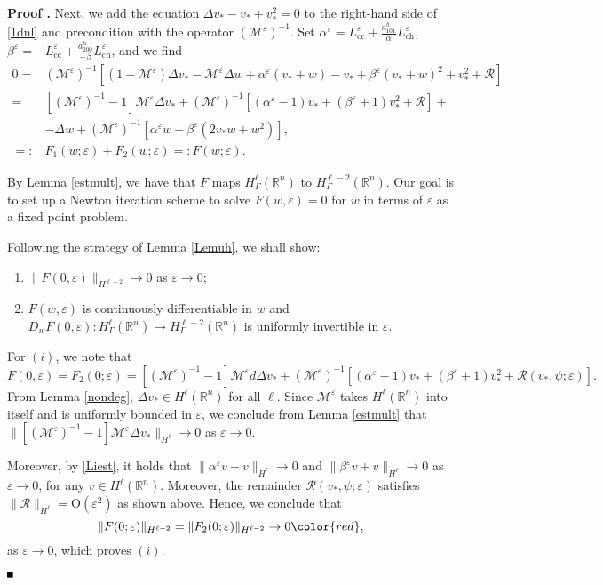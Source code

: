 \documentclass[10pt]{article}
\newenvironment{Proof}[1][\unskip]%
 {\begin{trivlist} \item[]{\bf Proof #1. }}%
 {\hspace*{\fill}$\rule{.4\baselineskip}{.4\baselineskip}$\end{trivlist}}
\newcommand{\R}{\mathbb{R}}
\newcommand{\rmO}{\mathrm{O}}
\newcommand{\eps}{\varepsilon}
\newcommand{\M}{\mathcal{M}}
\newcommand{\Rm}{\mathcal{R}}
\begin{document}
\begin{Proof}
Next, we add the equation $\Delta v_*-v_*+v_*^2 =0$ to the right-hand side of \eqref{1dnl} and precondition with the operator $(\M^{\eps})^{-1}$. Set $\alpha^\eps = L_\mathrm{cc}^\eps + \frac{a_{101}^h}{\alpha} L_\mathrm{ch}^\eps $, $\beta^\eps=-L_\mathrm{cc}^\eps +\frac{a_{200}^h}{-\beta} L_\mathrm{ch}^\eps $, and we find
\begin{align}
0 =&(\M^\eps)^{-1}\left[ (1-\M^\eps)\Delta v_* -\M^\eps \Delta w+\alpha^\eps(v_*+w)-v_*+\beta^\eps(v_*+w)^2+v_*^2 + \Rm \right] \nonumber \\ 
=& [(\M^{\eps})^{-1}-1]\M^\eps \Delta v_*+(\M^{\eps})^{-1}\left[ (\alpha^\eps-1)v_*+(\beta^\eps+1)v_*^2+\Rm \right]+ \nonumber \\
&-\Delta w+(\M^{\eps})^{-1}\left[\alpha^\eps w+\beta^\eps(2v_*w+w^2)\right], \nonumber \\
=: &F_1(w;\eps)+F_2(w;\eps)=: F(w;\eps).  \label{splfynl}
\end{align}

By Lemma \ref{estmult}, we have that $F$ maps $H^\ell_{\Gamma}(\R^n)$ to $H_{\Gamma}^{\ell-2}(\R^n)$. Our goal is to set up a Newton iteration scheme to solve $ F(w,\eps) =0$ for $w$ in terms of $\eps$ as a fixed point problem.

Following the strategy of Lemma \ref{Lemuh}, we shall show:
\begin{enumerate}
\item $\|F(0,\eps)\|_{H^{\ell-2}} \to 0$ as $\eps \to 0$;
\item $F(w,\eps)$ is continuously differentiable in $w$ and $D_wF(0,\eps): H^{\ell}_{\Gamma}(\R^n) \to H^{\ell-2}_{\Gamma}(\R^n)$ is uniformly invertible in $\eps$.
\end{enumerate}
For $(i)$, we note that
\[
F(0,\eps) = F_2(0;\eps) = [(\M^{\eps})^{-1}-1]\M^\eps d \Delta v_*+(\M^\eps)^{-1}[(\alpha^\eps-1)v_*+(\beta^\eps+1)v_*^2+\Rm(v_*,\psi;\eps)].
\]
From Lemma \ref{nondeg}, $\Delta v_* \in H^\ell(\R^n)$ for all $\ell$. Since $\M^\eps$ takes $H^\ell(\R^n)$ into itself and is uniformly bounded in $\eps$, we conclude from Lemma \ref{estmult} that 
$\|[(\M^{\eps})^{-1}-1]\M^\eps  \Delta v_* \|_{H^\ell} \to 0$
as $\eps \to 0$.

Moreover, by  \eqref{Liest}, it holds that $\| \alpha^\eps v -v\|_{H^\ell} \to 0$ and $\| \beta^\eps v + v\|_{H^\ell} \to 0$ as $\eps \to 0$, for any $v \in H^\ell(\R^n)$. Moreover, the remainder $\Rm(v_*,\psi;\eps)$ satisfies $\|\Rm\|_{H^\ell} = \rmO(\eps^2)$ as shown above. Hence, we conclude that 
\[
\| F(0;\eps)\|_{H^{\ell-2}} = \| F_2(0;\eps)\|_{H^{\ell-2} }\to 0 \color{red},
\]
as $\eps \to 0$, which proves $(i)$.


\end{Proof}
\end{document}

